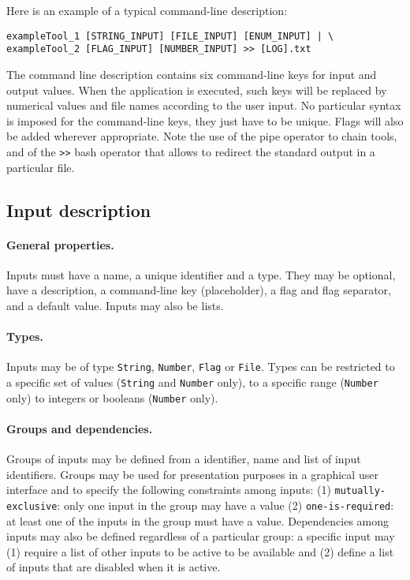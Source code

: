 \documentclass{article}
\begin{document}
Here is an example of a typical command-line description:
\begin{verbatim}
exampleTool_1 [STRING_INPUT] [FILE_INPUT] [ENUM_INPUT] | \
exampleTool_2 [FLAG_INPUT] [NUMBER_INPUT] >> [LOG].txt
\end{verbatim}
The command line description contains six command-line keys for input
and output values. When the application is executed, such keys will be
replaced by numerical values and file names according to the user
input. No particular syntax is imposed for the command-line keys, they
just have to be unique. Flags will also be added wherever
appropriate. Note the use of the pipe operator to chain tools, and of
the \texttt{>>} bash operator that allows to redirect the standard
output in a particular file.

\subsection{Input description}

\paragraph{General properties.} Inputs must have a name, a unique
identifier and a type. They may be optional, have a description, a
command-line key (placeholder), a flag and flag separator, and a
default value. Inputs may also be lists.

\paragraph{Types.} Inputs may be of type \texttt{String},
\texttt{Number}, \texttt{Flag} or \texttt{File}. Types can be
restricted to a specific set of values (\texttt{String} and
\texttt{Number} only), to a specific range (\texttt{Number} only) to
integers or booleans (\texttt{Number} only). 

\paragraph{Groups and dependencies.} Groups of inputs may be defined
from a identifier, name and list of input identifiers. Groups may be
used for presentation purposes in a graphical user interface and to
specify the following constraints among inputs: (1)
\texttt{mutually-exclusive}: only one input in the group may have a
value (2) \texttt{one-is-required}: at least one of the inputs in the
group must have a value. Dependencies among inputs may also be defined
regardless of a particular group: a specific input may (1) require a
list of other inputs to be active to be available and (2) define a
list of inputs that are disabled when it is active.
\end{document}
